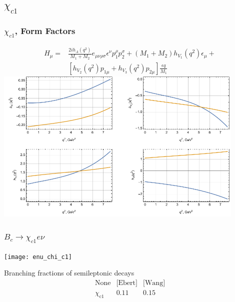 \documentclass{beamer}
\begin{document}
\begin{frame}[t]
\begin{columns}
\begin{column}{0.5\textwidth}
    \end{column}
  \end{columns}
\end{frame}

\subsection{$\chi_{c1}$}
\begin{frame}
  \frametitle{$\chi_{c1}$, Form Factors}
  \begin{align*}
    \label{eq:1}
    H_\mu =& \frac{2i h_A(q^2)}{M_1+M_2}e_{\mu\nu\rho\sigma}\epsilon^\nu p_1^\rho p_2^\sigma
             + (M_1+M_2) h_{V_1}(q^2)\epsilon_\mu + \\
     & [h_{V_2}(q^2)p_{1\mu} + h_{V_3}(q^2)p_{2\mu}]\frac{\epsilon q}{M_1}
  \end{align*}
  \includegraphics[width=0.9\textwidth]{figs/ff_chi_c1}
\end{frame}


\begin{frame}
  \frametitle{$B_c \to \chi_{c1} e \nu$}
  \begin{center}
    \texttt{[image: enu\_chi\_c1]}
  \end{center}
  Branching fractions of semileptonic decays
  $$
\begin{array}{c|cc}
 \text{None} & \text{[Ebert]} & \text{[Wang]} \\
\hline
 \chi _{\text{c1}} & 0.11 & 0.15 \\
\end{array}
$$
\end{frame}
\end{document}
